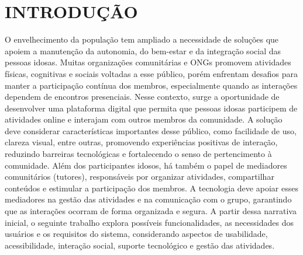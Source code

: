 \newpage
\section{INTRODUÇÃO}
O envelhecimento da população tem ampliado a necessidade de soluções que apoiem a manutenção da autonomia, do bem-estar e da integração social das pessoas idosas. 
Muitas organizações comunitárias e ONGs promovem atividades físicas, cognitivas e sociais voltadas a esse público, porém enfrentam desafios para manter a participação contínua dos membros, especialmente quando as interações dependem de encontros presenciais. Nesse contexto, surge a oportunidade de desenvolver uma plataforma digital que permita que pessoas idosas participem de atividades online e interajam com outros membros da comunidade.
A solução deve considerar características importantes desse público, como facilidade de uso, clareza visual, entre outras, promovendo experiências positivas de interação, reduzindo barreiras tecnológicas e fortalecendo o senso de pertencimento à comunidade. 
Além dos participantes idosos, há também o papel de mediadores comunitários (tutores), responsáveis por organizar atividades, compartilhar conteúdos e estimular a participação dos membros. A tecnologia deve apoiar esses mediadores na gestão das atividades e na comunicação com o grupo, garantindo que as interações ocorram de forma organizada e
segura.
A partir dessa narrativa inicial, o seguinte trabalho explora possíveis funcionalidades, as necessidades dos usuários e os requisitos do sistema, considerando aspectos de usabilidade, acessibilidade, interação social, suporte tecnológico e gestão das atividades.